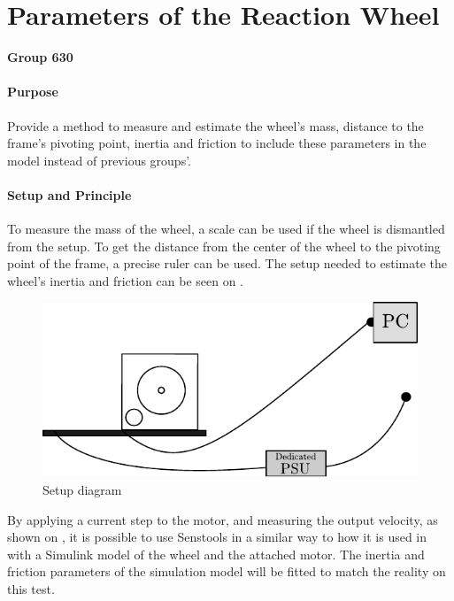 \chapter{Parameters of the Reaction Wheel}\label{app:wheelParameters} 
\textbf{Group 630}\\

\subsubsection{Purpose}
Provide a method to measure and estimate the wheel's mass, distance to the frame's pivoting point, inertia and friction to include these parameters in the model instead of previous groups'.

\subsubsection{Setup and Principle}

To measure the mass of the wheel, a scale can be used if the wheel is dismantled from the setup. To get the distance from the center of the wheel to the pivoting point of the frame, a precise ruler can be used.
The setup needed to estimate the wheel's inertia and friction can be seen on .
\begin{figure}[H]
  \centering
  \includegraphics[scale=1]{figures/wheelParameterTestSetup}
  \caption{Setup diagram}
  \label{fig:wheelParameterTestSetup}
\end{figure}

By applying a current step to the motor, and measuring the output velocity, as shown on , it is possible to use Senstools in a similar way to how it is used in  with a Simulink model of the wheel and the attached motor. The inertia and friction parameters of the simulation model will be fitted to match the reality on this test.

